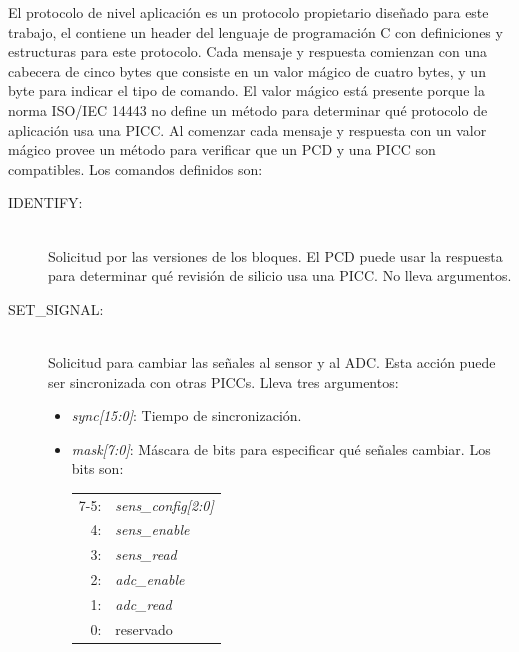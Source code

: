 \documentclass[a4paper, twoside, 11pt]{report}
\begin{document}
El protocolo de nivel aplicación es un protocolo propietario diseñado para este trabajo, el  contiene un header del lenguaje de programación C con definiciones y estructuras para este protocolo. Cada mensaje y respuesta comienzan con una cabecera de cinco bytes que consiste en un valor mágico de cuatro bytes, y un byte para indicar el tipo de comando. El valor mágico está presente porque la norma ISO/IEC 14443 no define un método para determinar qué protocolo de aplicación usa una PICC. Al comenzar cada mensaje y respuesta con un valor mágico provee un método para verificar que un PCD y una PICC son compatibles. Los comandos definidos son:

\begin{description}
  \item[IDENTIFY:] \hfill \\ Solicitud por las versiones de los bloques. El PCD puede usar la respuesta para determinar qué revisión de silicio usa una PICC. No lleva argumentos.
  \item[SET\_SIGNAL:] \hfill \\ Solicitud para cambiar las señales al sensor y al ADC. Esta acción puede ser sincronizada con otras PICCs. Lleva tres argumentos:
  \begin{itemize}
    \item \textit{sync[15:0]}: Tiempo de sincronización.
    \item \textit{mask[7:0]}: Máscara de bits para especificar qué señales cambiar. Los bits son:
    \begin{tabular}{r l}
      7-5: & \textit{sens\_config[2:0]} \\
      4: & \textit{sens\_enable} \\
      3: & \textit{sens\_read} \\
      2: & \textit{adc\_enable} \\
      1: & \textit{adc\_read} \\
      0: & reservado \\
    \end{tabular}

\end{itemize}
\end{description}
\end{document}
